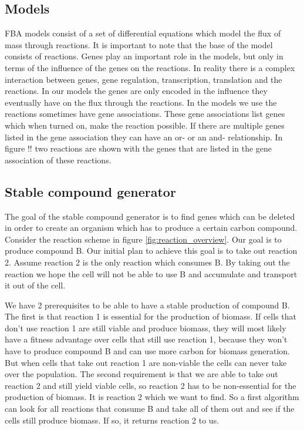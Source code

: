 \documentclass[10pt]{report}
\begin{document}
\subsection{Models}\label{sec:intro_models}
FBA models consist of a set of differential equations which model the flux of mass through reactions. It is important to note that the base of the model consists of reactions. Genes play an important role in the models, but only in terms of the influence of the genes on the reactions. In reality there is a complex interaction between genes, gene regulation, transcription, translation and the reactions. In our models the genes are only encoded in the influence they eventually have on the flux through the reactions. In the models we use the reactions sometimes have gene associations. These gene associations list genes which when turned on, make the reaction possible. If there are multiple genes listed in the gene association they can have an or- or an and- relationship. In figure !! two reactions are shown with the genes that are listed in the gene association of these reactions. 

\subsection{Stable compound generator}
The goal of the stable compound generator is to find genes which can be deleted in order to create an organism which has to produce a certain carbon compound. Consider the reaction scheme in figure \ref{fig:reaction_overview}. Our goal is to produce compound B. Our initial plan to achieve this goal is to take out reaction 2. Assume reaction 2 is the only reaction which consumes B. By taking out the reaction we hope the cell will not be able to use B and accumulate and transport it out of the cell.

We have 2 prerequisites to be able to have a stable production of compound B. The first is that reaction 1 is essential for the production of biomass. If cells that don't use reaction 1 are still viable and produce biomass, they will most likely have a fitness advantage over cells that still use reaction 1, because they won't have to produce compound B and can use more carbon for biomass generation. But when cells that take out reaction 1 are non-viable the cells can never take over the population.
The second requirement is that we are able to take out reaction 2 and still yield viable cells, so reaction 2 has to be non-essential for the production of biomass. It is reaction 2 which we want to find. So a first algorithm can look for all reactions that consume B and take all of them out and see if the cells still produce biomass. If so, it returns reaction 2 to us.
\end{document}
